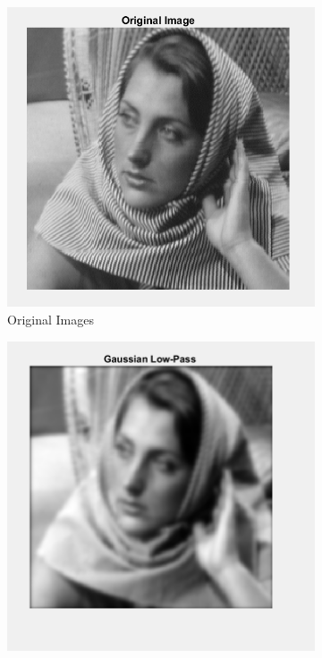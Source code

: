\documentclass[a4paper]{article}
\begin{document}
\begin{figure}[h]
    \centering
    \begin{subfigure}{0.33\linewidth}
        \centering
        \includegraphics[width=\linewidth]{ori.png}
        \caption{Original Images}
    \end{subfigure}
    \begin{subfigure}{0.33\linewidth}
        \centering
        \includegraphics[width=\linewidth]{40_image.png}

\end{subfigure}
\end{figure}
\end{document}
